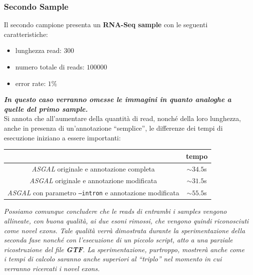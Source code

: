 \documentclass[a4paper,12pt, oneside]{book}
\begin{document}
\subsubsection{Secondo Sample}
Il secondo campione presenta un \textbf{RNA-Seq sample} con le seguenti
caratteristiche:
\begin{itemize}
  \item lunghezza read: $300$
  \item numero totale di reads: $100000$
  \item error rate: $1\%$
\end{itemize}
\textbf{\textit{In questo caso verranno omesse le immagini in quanto analoghe a
    quelle del primo sample.}}\\
Si annota che all'aumentare della quantità di read, nonché della loro lunghezza,
anche in presenza di un'annotazione ``semplice'', le differenze dei tempi di
esecuzione iniziano a essere importanti: 
\begin{center}
  \begin{tabular}{c|c}
     \cellcolor[gray]{0.6}&  \cellcolor[gray]{0.8}tempo \\
    \hline
    \textit{ASGAL} originale e annotazione completa & $\sim 34.5$s\\
    \hline
    \textit{ASGAL} originale e annotazione modificata & $\sim 31.5$s\\
    \hline
    \textit{ASGAL} con parametro \texttt{--intron}
    e annotazione modificata & $\sim 55.5$s 
  \end{tabular}
\end{center}
\textit{Possiamo comunque concludere che le reads di entrambi i samples vengono
  allineate, con buona qualità, ai due esoni rimossi, che vengono quindi
  riconosciuti come \emph{novel exons}. Tale qualità verrà
  dimostrata durante la sperimentazione della \emph{seconda fase} nonché con
  l'esecuzione di un piccolo script, atto a una parziale ricostruzione del file
  \textbf{GTF}. La sperimentazione, purtroppo, mostrerà anche come i tempi di
  calcolo saranno anche superiori al ``triplo''  nel momento in cui verranno
  ricercati i \emph{novel exons}.}
\end{document}
